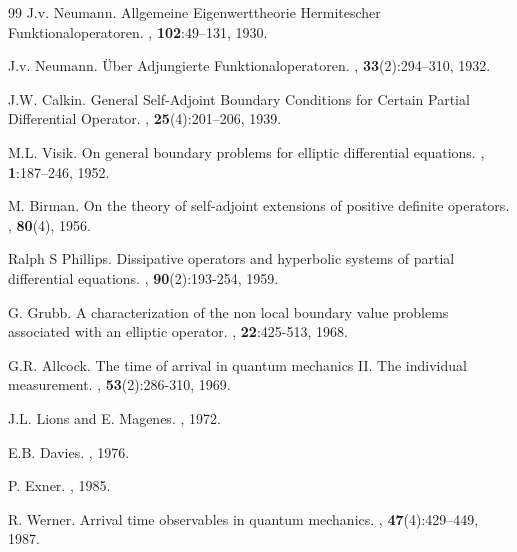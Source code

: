 \documentclass{article}
\numberwithin{equation}{section}
\begin{document}
\begin{thebibliography}{99}
J.v. Neumann.
\newblock Allgemeine Eigenwerttheorie Hermitescher Funktionaloperatoren.
,
  \textbf{102}:49–131, 1930.
  
J.v. Neumann.
\newblock \"Uber Adjungierte Funktionaloperatoren.
, \textbf{33}(2):294–310, 1932.

J.W. Calkin.
\newblock General Self-Adjoint Boundary Conditions for Certain Partial Differential
Operator.
, \textbf{25}(4):201–206, 1939.

M.L. Visik.
\newblock On general boundary problems for elliptic differential equations.
, \textbf{1}:187–246, 1952.

M. Birman.
\newblock On the theory of self-adjoint extensions of positive definite operators.
, \textbf{80}(4), 1956.

Ralph S Phillips.
\newblock Dissipative operators and hyperbolic systems of partial differential equations.
, \textbf{90}(2):193-254, 1959.

G. Grubb.
\newblock A characterization of the non local boundary value problems associated with an elliptic operator.
, \textbf{22}:425-513, 1968.

G.R. Allcock.
\newblock The time of arrival in quantum mechanics II. The individual measurement.
, \textbf{53}(2):286-310, 1969.

J.L. Lions and E. Magenes.
, 1972.

E.B. Davies.
, 1976.

P. Exner.
, 1985.

R. Werner.
\newblock Arrival time observables in quantum mechanics.
, \textbf{47}(4):429–449, 1987.


\end{thebibliography}
\end{document}
